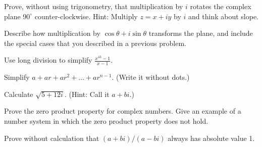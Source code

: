 \documentclass[space,nooutcomes]{ximera}
\begin{document}
\begin{problem}
Prove, without using trigonometry, that multiplication by $i$ rotates the complex plane $90^{\circ}$ counter-clockwise.  Hint: Multiply $z=x+iy$ by $i$ and think about slope.
\vfill 
\end{problem}


\begin{problem}
Describe how multiplication by $\cos\theta + i\sin\theta$ transforms the plane, and include the special cases that you described in a previous problem.
\vfill 
\end{problem}


\newpage 



\begin{problem}
Use long division to simplify $\frac{x^{43}-1}{x-1}$.
\vfill 
\end{problem}

\begin{problem}
Simplify $a+ar+ar^2+\dots+ar^{n-1}$.  (Write it without dots.)
\vfill 
\end{problem}

\begin{problem}
Calculate $\sqrt{5+12i}$.  (Hint: Call it $a + bi$.)  
\vfill 
\end{problem}

\begin{problem}
Prove the zero product property for complex numbers.  Give an example of a number system in which the zero product property does not hold.
\vfill 
\end{problem}

\newpage 


\begin{problem}
Prove without calculation that $(a+bi)/(a-bi)$ always has absolute value 1.  
\vfill 
\end{problem}
\end{document}
